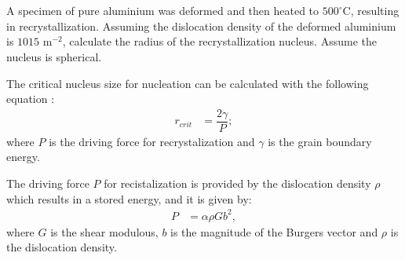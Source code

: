 \newpage
\section{}

A specimen of pure aluminium was deformed and then heated to $500^{\circ}$C, resulting in recrystallization. Assuming the dislocation density of the deformed aluminium is $1015$ m$^{-2}$, calculate the radius of the recrystallization nucleus. Assume the nucleus is spherical.

The critical nucleus size for nucleation can be calculated with the following equation \citet{rollett2017recrystallization}:
\begin{align}
    \label{eq:r_recrystallization}
    r_{crit}&=\dfrac{2\gamma}{P};
\end{align}
where $P$ is the driving force for recrystalization and $\gamma$ is the grain boundary energy.

The driving force $P$ for recistalization is provided by the dislocation density $\rho$ which results in a stored energy, and it is given by:
\begin{align}
    \label{eq:drivin_force}
    P&=\alpha \rho Gb^2,
\end{align}
where $G$ is the shear modulous, $b$ is the magnitude of the Burgers vector and $\rho$ is the dislocation density. 
